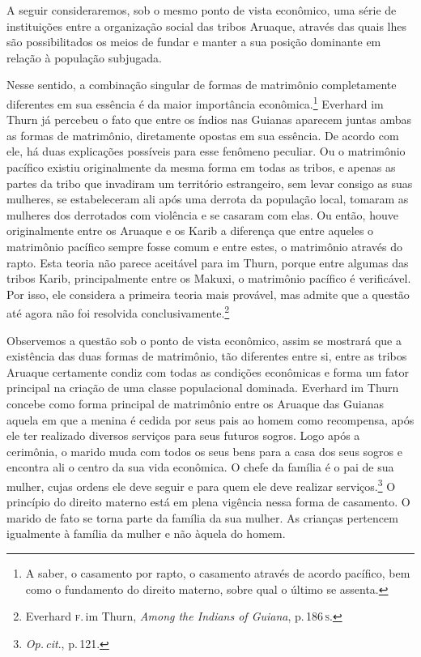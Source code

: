 A seguir consideraremos, sob o mesmo ponto de vista econômico, uma série
de instituições entre a organização social das tribos Aruaque, através
das quais lhes são possibilitados os meios de fundar e manter a sua
posição dominante em relação à população subjugada.

Nesse sentido, a combinação singular de formas de matrimônio
completamente diferentes em sua essência é da maior importância
econômica.\footnote{A saber, o casamento por rapto, o casamento através de
acordo pacífico, bem como o fundamento do direito materno, sobre qual o
último se assenta.} Everhard im Thurn já percebeu o fato que entre os
índios nas Guianas aparecem juntas ambas as formas de matrimônio,
diretamente opostas em sua essência. De acordo com ele, há duas
explicações possíveis para esse fenômeno peculiar. Ou o matrimônio
pacífico existiu originalmente da mesma forma em todas as tribos, e
apenas as partes da tribo que invadiram um território estrangeiro, sem
levar consigo as suas mulheres, se estabeleceram ali após uma derrota
da população local, tomaram as mulheres dos derrotados com violência e
se casaram com elas. Ou então, houve originalmente entre os Aruaque e os
Karib a diferença que entre aqueles o matrimônio pacífico sempre fosse
comum e entre estes, o matrimônio através do rapto. Esta teoria não
parece aceitável para im Thurn, porque entre algumas das tribos Karib,
principalmente entre os Makuxi, o matrimônio pacífico é verificável. Por
isso, ele considera a primeira teoria mais provável, mas admite que a
questão até agora não foi resolvida conclusivamente.\footnote{Everhard
  \textsc{f}.\,im Thurn, \textit{Among the Indians of Guiana}, p.\,186\,\textsc{s}.}

Observemos a questão sob o ponto de vista econômico, assim se mostrará
que a existência das duas formas de matrimônio, tão diferentes entre si,
entre as tribos Aruaque certamente condiz com todas as condições
econômicas e forma um fator principal na criação de uma classe
populacional dominada. Everhard im Thurn concebe como forma principal
de matrimônio entre os Aruaque das Guianas aquela em que a menina é
cedida por seus pais ao homem como recompensa, após ele ter realizado
diversos serviços para seus futuros sogros. Logo após a cerimônia, o
marido muda com todos os seus bens para a casa dos seus sogros e
encontra ali o centro da sua vida econômica. O chefe da família é o pai
de sua mulher, cujas ordens ele deve seguir e para quem ele deve
realizar serviços.\footnote{\textit{Op.\,cit}., p.\,121.} O princípio do direito
materno está em plena vigência nessa forma de casamento. O marido de
fato se torna parte da família da sua mulher. As crianças pertencem
igualmente à família da mulher e não àquela do homem.

